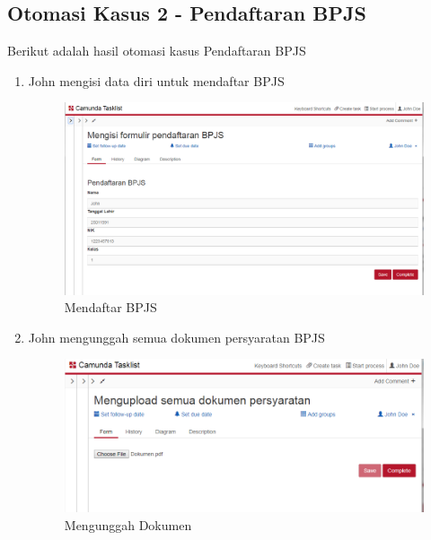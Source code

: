 		
\subsection{Otomasi Kasus 2 - Pendaftaran BPJS}
\label{menjalankancamunda_kasus2}
Berikut adalah hasil otomasi kasus Pendaftaran BPJS
\begin{enumerate}
	\item John mengisi data diri untuk mendaftar BPJS
	\begin{figure}[H]
			\centering
			\includegraphics[scale=0.4]{Gambar/Bab-3/BPMS/Kasus2/1}
			\caption{Mendaftar BPJS} 
			\label{fig:otomasi_kasus2_1}
	\end{figure}
	
	\item John mengunggah semua dokumen persyaratan BPJS
	\begin{figure}[H]
			\centering
			\includegraphics[scale=0.6]{Gambar/Bab-3/BPMS/Kasus2/2}
			\caption{Mengunggah Dokumen} 
			\label{fig:otomasi_kasus2_2}
	\end{figure}
	

\end{enumerate}
